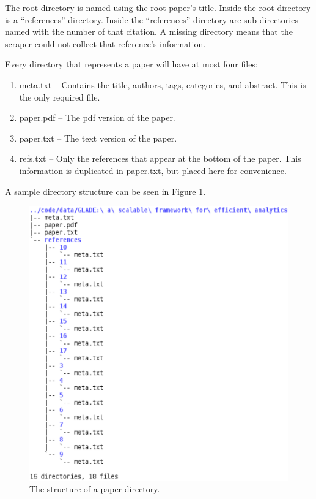 \documentclass[10pt, conference, compsocconf]{IEEEtran}
\begin{document}
The root directory is named using the root paper's title. Inside the root directory is a ``references'' directory.
Inside the ``references'' directory are sub-directories named with the number of that citation. A missing directory
means that the scraper could not collect that reference's information.

Every directory that represents a paper will have at most four files:
\begin{enumerate}
   \item meta.txt -- Contains the title, authors, tags, categories, and abstract. This is the only required file.
   \item paper.pdf -- The pdf version of the paper.
   \item paper.txt -- The text version of the paper.
   \item refs.txt -- Only the references that appear at the bottom of the paper. This information is duplicated in paper.txt, but placed here for convenience.
\end{enumerate}

A sample directory structure can be seen in Figure \ref{fig:tree}.

\begin{figure}[ht]
   \includegraphics[width=\columnwidth px]{images/tree.eps}
        \caption{The structure of a paper directory.}
        \label{fig:tree}
\end{figure}
\end{document}
